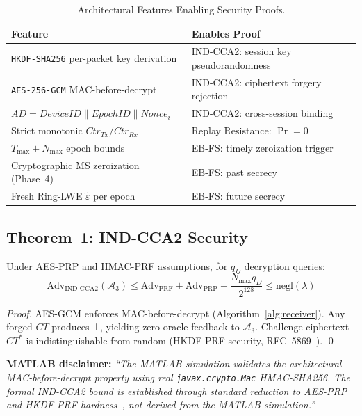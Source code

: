 \documentclass[runningheads]{llncs}
\newcommand{\GCM}{\texttt{AES-256-GCM}}
\newcommand{\HKDF}{\texttt{HKDF-SHA256}}
\newcommand{\Nmax}{N_{\max}}
\newcommand{\Tmax}{T_{\max}}
\begin{document}
\begin{table}[t]
\caption{Architectural Features Enabling Security Proofs.}
\label{tab:proofarch}
\centering
\begin{tabular}{|p{4.5cm}|p{5.0cm}|}
\hline
\textbf{Feature} & \textbf{Enables Proof} \\
\hline
\HKDF{} per-packet key derivation & IND-CCA2: session key pseudorandomness \\
\GCM{} MAC-before-decrypt & IND-CCA2: ciphertext forgery rejection \\
$AD = \mathit{DeviceID} \| \mathit{EpochID} \| \mathit{Nonce}_i$ & IND-CCA2: cross-session binding \\
Strict monotonic $\mathit{Ctr}_{Tx}/\mathit{Ctr}_{Rx}$ & Replay Resistance: $\Pr = 0$ \\
$\Tmax + \Nmax$ epoch bounds & EB-FS: timely zeroization trigger \\
Cryptographic MS zeroization (Phase~4) & EB-FS: past secrecy \\
Fresh Ring-LWE $\tilde{\varepsilon}$ per epoch & EB-FS: future secrecy \\
\hline
\end{tabular}
\end{table}

\subsection{Theorem~1: IND-CCA2 Security}

\begin{theorem}
\label{thm:indcca2}
Under AES-PRP and HMAC-PRF assumptions, for $q_D$ decryption queries:
\begin{equation}
\mathrm{Adv}_{\mathrm{IND\text{-}CCA2}}(\mathcal{A}_3)
\leq \mathrm{Adv}_{\mathrm{PRF}} + \mathrm{Adv}_{\mathrm{PRP}}
+ \frac{N_{\max} q_D}{2^{128}} \leq \mathrm{negl}(\lambda)
\end{equation}
\end{theorem}

\begin{proof}
AES-GCM enforces MAC-before-decrypt (Algorithm~\ref{alg:receiver}). Any forged
$CT$ produces $\bot$, yielding zero oracle feedback to $\mathcal{A}_3$.
Challenge ciphertext $CT^*$ is indistinguishable from random (HKDF-PRF security,
RFC~5869~\cite{rfc5869}). \qed
\end{proof}

\noindent\textbf{MATLAB disclaimer:}
\emph{``The MATLAB simulation validates the architectural MAC-before-decrypt
property using real \texttt{javax.crypto.Mac} HMAC-SHA256. The formal IND-CCA2
bound is established through standard reduction to AES-PRP and HKDF-PRF
hardness~\cite{rfc5869}, not derived from the MATLAB simulation.''}
\end{document}

